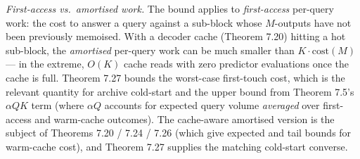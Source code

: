 \documentclass[
]{article}
\begin{document}
\emph{First-access vs.\ amortised work.} The bound applies to
\emph{first-access} per-query work: the cost to answer a query
against a sub-block whose $M$-outputs have not been previously
memoised. With a decoder cache (Theorem 7.20) hitting a hot
sub-block, the \emph{amortised} per-query work can be much smaller
than $K \cdot \mathrm{cost}(M)$ --- in the extreme, $O(K)$ cache
reads with zero predictor evaluations once the cache is full.
Theorem 7.27 bounds the worst-case first-touch cost, which is the
relevant quantity for archive cold-start and the upper bound from
Theorem 7.5's $\alpha Q K$ term (where $\alpha Q$ accounts for
expected query volume \emph{averaged} over first-access and
warm-cache outcomes). The cache-aware amortised version is the
subject of Theorems 7.20 / 7.24 / 7.26 (which give expected and
tail bounds for warm-cache cost), and Theorem 7.27 supplies the
matching cold-start converse.
\end{document}
